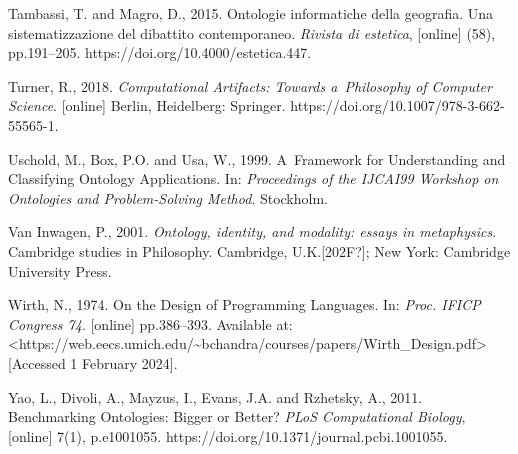 Tambassi, T. and Magro, D., 2015. Ontologie informatiche della geografia. Una sistematizzazione del dibattito contemporaneo. \textit{Rivista di estetica}, [online] (58), pp.191–205. https://doi.org/10.4000/estetica.447.



Turner, R., 2018. \textit{Computational Artifacts: Towards a~Philosophy of Computer Science}. [online] Berlin, Heidelberg: Springer. https://doi.org/10.1007/978-3-662-55565-1.



Uschold, M., Box, P.O. and Usa, W., 1999. A~Framework for Understanding and Classifying Ontology Applications. In: \textit{Proceedings of the IJCAI99 Workshop on Ontologies and Problem-Solving Method}. Stockholm.



Van Inwagen, P., 2001. \textit{Ontology, identity, and modality: essays in metaphysics}. Cambridge studies in Philosophy. Cambridge, U.K.[202F?]; New York: Cambridge University Press.



Wirth, N., 1974. On the Design of Programming Languages. In: \textit{Proc. IFICP Congress 74}. [online] pp.386–393. Available at: {\textless}https://web.eecs.umich.edu/\~{}bchandra/courses/papers/Wirth\_Design.pdf{\textgreater} [Accessed 1 February 2024].



Yao, L., Divoli, A., Mayzus, I., Evans, J.A. and Rzhetsky, A., 2011. Benchmarking Ontologies: Bigger or Better? \textit{PLoS Computational Biology}, [online] 7(1), p.e1001055. https://doi.org/10.1371/journal.pcbi.1001055.



